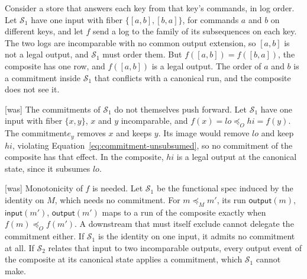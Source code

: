 \documentclass[sigconf]{cidr-2027}
\theoremstyle{remark}
\newcommand{\OutputOrd}{\preceq_O}
\newcommand{\commitment}{commitment\xspace}
\newcommand{\commitments}{commitments\xspace}
\newcommand{\outnoun}{output extension\xspace}%
\newcommand{\Spec}{\mathcal{S}}
\begin{document}
Consider a store that answers each key from that key's commands, in log
order.  Let $\Spec_1$ have one input with fiber $\{[a,b],[b,a]\}$, for
commands $a$ and $b$ on different keys, and let $f$ send a log to the family
of its subsequences on each key.  The two logs are incomparable with no common
\outnoun, so $[a,b]$ is not a legal output, and $\Spec_1$ must order them.  But
$f([a,b])=f([b,a])$, the composite has one row, and $f([a,b])$ is a legal
output.
The order of $a$ and $b$ is a \commitment inside $\Spec_1$ that conflicts
with a canonical run, and the composite does not see it.



{\footnotesize\color{black!50}\noindent\textsf{[was]} The \commitments of $\Spec_1$ do not themselves push forward.  Let $\Spec_1$
have one input with fiber $\{x,y\}$, $x$ and $y$ incomparable, and
$f(x)=\mathit{lo}\OutputOrd\mathit{hi}=f(y)$.  The \commitment $e_y$ removes $x$
and keeps $y$.  Its image would remove $\mathit{lo}$ and keep $\mathit{hi}$,
violating Equation~\ref{eq:commitment-unsubsumed}, so no \commitment of the
composite has that effect.  In the composite, $\mathit{hi}$ is a legal output
at the canonical state, since it subsumes $\mathit{lo}$.\par}



{\footnotesize\color{black!50}\noindent\textsf{[was]} Monotonicity of $f$ is needed.  Let $\Spec_1$ be the functional spec
induced by the identity on
$M$, which needs no \commitment.  For $m\preceq_M m'$, its run
$\mathsf{output}(m)$, $\mathsf{input}(m')$, $\mathsf{output}(m')$ maps to a run
of the composite exactly when $f(m)\OutputOrd f(m')$.  A downstream that must
itself exclude cannot delegate the \commitment either.  If $\Spec_1$ is the identity
on one input, it admits no \commitment at all.  If $\Spec_2$ relates that input
to two incomparable outputs, every output event of the composite at its
canonical state applies a \commitment, which $\Spec_1$ cannot make.\par}
\end{document}

